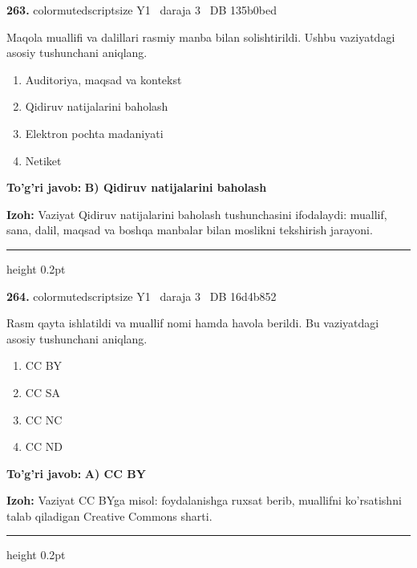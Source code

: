 \documentclass[10pt,a4paper,oneside]{article}
\begin{document}
\noindent\textbf{\color{ink}263.}  {color{muted}scriptsize Y1 \textbullet\ daraja 3 \textbullet\ DB 135b0bed}
\par
Maqola muallifi va dalillari rasmiy manba bilan solishtirildi. Ushbu vaziyatdagi asosiy tushunchani aniqlang.
\begin{enumerate}[label=\Alph*),leftmargin=9mm]
\item Auditoriya, maqsad va kontekst
\item Qidiruv natijalarini baholash
\item Elektron pochta madaniyati
\item Netiket
\end{enumerate}
\begin{tcolorbox}[enhanced,breakable,colback=teal!4,colframe=teal!50!black,boxrule=0.5pt,arc=1.1mm,left=3mm,right=3mm,top=1.7mm,bottom=1.7mm,before skip=2mm,after skip=2mm]
\textbf{\color{teal}To'g'ri javob:} \textbf{B) Qidiruv natijalarini baholash}
\par\smallskip
\textbf{Izoh:} Vaziyat Qidiruv natijalarini baholash tushunchasini ifodalaydi: muallif, sana, dalil, maqsad va boshqa manbalar bilan moslikni tekshirish jarayoni.
\end{tcolorbox}
\vspace{2mm}\hrule height 0.2pt \vspace{3mm}

\noindent\textbf{\color{ink}264.}  {color{muted}scriptsize Y1 \textbullet\ daraja 3 \textbullet\ DB 16d4b852}
\par
Rasm qayta ishlatildi va muallif nomi hamda havola berildi. Bu vaziyatdagi asosiy tushunchani aniqlang.
\begin{enumerate}[label=\Alph*),leftmargin=9mm]
\item CC BY
\item CC SA
\item CC NC
\item CC ND
\end{enumerate}
\begin{tcolorbox}[enhanced,breakable,colback=teal!4,colframe=teal!50!black,boxrule=0.5pt,arc=1.1mm,left=3mm,right=3mm,top=1.7mm,bottom=1.7mm,before skip=2mm,after skip=2mm]
\textbf{\color{teal}To'g'ri javob:} \textbf{A) CC BY}
\par\smallskip
\textbf{Izoh:} Vaziyat CC BYga misol: foydalanishga ruxsat berib, muallifni ko'rsatishni talab qiladigan Creative Commons sharti.
\end{tcolorbox}
\vspace{2mm}\hrule height 0.2pt \vspace{3mm}
\end{document}
